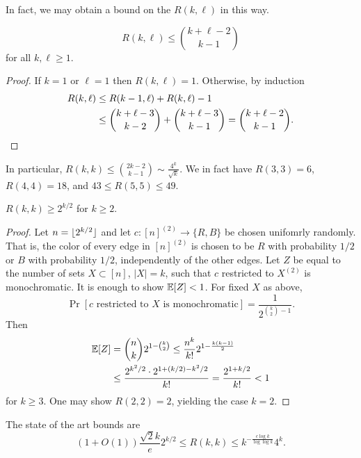 In fact, we may obtain a bound on the $R(k,\ell)$ in this way.
\begin{corollary}
\[
R(k,\ell)\leq {k+\ell -2 \choose k-1}
\]
for all $k,\ell \geq 1$.
\end{corollary}
\begin{proof}  
If $k=1$ or $\ell=1$ then $R(k,\ell)=1$. Otherwise, by induction
\begin{align*}  
R(k,\ell) &\leq R(k-1,\ell) + R(k,\ell)-1 \\
&\leq {k+\ell -3 \choose k-2} + {k+\ell -3 \choose k-1} = {k+\ell-2 \choose k-1}.\qedhere
\end{align*}
\end{proof}
\begin{remark}
In particular, $R(k,k) \leq {2k-2\choose k-1} \sim \frac{4^k}{\sqrt{k}}$. We in fact have $R(3,3) = 6$, $R(4,4)=18$, and $43\leq R(5,5) \leq 49$. 
\end{remark}

\begin{theorem}
$R(k,k)\geq 2^{k/2}$ for $k\geq 2$.
\end{theorem}
\begin{proof}  
Let $n = \lfloor2^{k/2}\rfloor$ and let $c:[n]^{(2)}\to \{R,B\}$ be chosen unifomrly randomly. That is, the color of every edge in $[n]^{(2)}$ is chosen to be $R$ with probability $1/2$ or $B$ with probability $1/2$, independently of the other edges. Let $Z$ be equal to the number of sets $X\subset[n]$, $|X|=k$, such that $c$ restricted to $X^{(2)}$ is monochromatic. It is enough to show $\mathbb{E}[Z] < 1$. 
For fixed $X$ as above,
\[
\Pr[c \text{ restricted to }X\text{ is monochromatic}] = \frac{1}{2^{{k\choose 2}-1}}.
\]
Then
\begin{align*}  
\mathbb{E}[Z] &= {n\choose k} 2^{1 - {k\choose 2}}\leq \frac{n^k}{k!}2^{1 - \frac{k(k-1)}{2}}\\
&\leq \frac{2^{k^2/2}\cdot 2^{1 + (k/2) - k^2/2}}{k!} = \frac{2^{1+k/2}}{k!}<1
\end{align*}
for $k\geq 3$. One may show $R(2,2) = 2$, yielding the case $k=2$.
\end{proof}
The state of the art bounds are
\[
(1 + O(1)) \frac{\sqrt{2}k}{e}2^{k/2}\leq R(k,k) \leq k^{- \frac{c\log k}{\log \log k}}4^k.
\]


